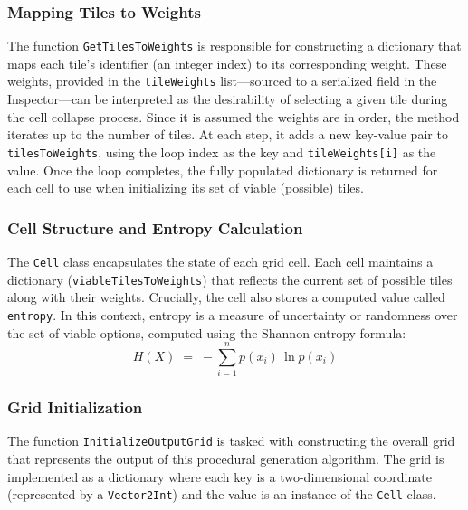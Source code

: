 \documentclass[a4paper, 12pt, one column, aas_macros]{article}
\begin{document}
\subsubsection{Mapping Tiles to Weights}
The function \texttt{GetTilesToWeights} is responsible for constructing a dictionary that maps each tile's identifier (an integer index) to its corresponding weight. These weights, provided in the \texttt{tileWeights} list---sourced to a serialized field in the Inspector---can be interpreted as the desirability of selecting a given tile during the cell collapse process. Since it is assumed the weights are in order, the method iterates up to the number of tiles. At each step, it adds a new key-value pair to \texttt{tilesToWeights}, using the loop index as the key and \texttt{tileWeights[i]} as the value. Once the loop completes, the fully populated dictionary is returned for each cell to use when initializing its set of viable (possible) tiles.

\subsubsection{Cell Structure and Entropy Calculation}
The \texttt{Cell} class encapsulates the state of each grid cell. Each cell maintains a dictionary (\texttt{viableTilesToWeights}) that reflects the current set of possible tiles along with their weights. Crucially, the cell also stores a computed value called \texttt{entropy}. In this context, entropy is a measure of uncertainty or randomness over the set of viable options, computed using the Shannon entropy formula:
\begin{equation}
  H(X) \;=\; -\sum_{i=1}^{n} p(x_i)\,\ln p(x_i)
\end{equation}

\subsubsection{Grid Initialization}
The function \texttt{InitializeOutputGrid} is tasked with constructing the overall grid that represents the output of this procedural generation algorithm. The grid is implemented as a dictionary where each key is a two-dimensional coordinate (represented by a \texttt{Vector2Int}) and the value is an instance of the \texttt{Cell} class.
\end{document}
